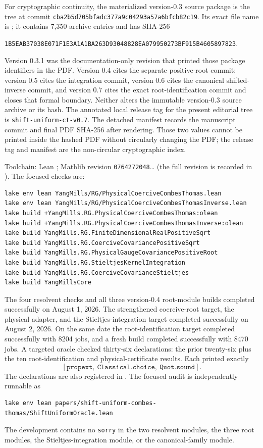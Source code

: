 \documentclass[11pt]{article}
\theoremstyle{definition}
\newcommand{\lean}[1]{\texttt{#1}}
\begin{document}
For cryptographic continuity, the materialized version-0.3 source package is
the tree at commit
\lean{cba2b5d705bfadc377a9c04293a57a6bfcb82c19}.  Its exact file name is
; it contains 7,350 archive
entries and has SHA-256
\begin{center}
\small\lean{1B5EAB37038E071F1E3A1A1BA263D93048828EA079950273BF915B4605897823}.
\end{center}
Version 0.3.1 was the documentation-only revision that printed those package
identifiers in the PDF.  Version 0.4 cites the separate positive-root commit;
version 0.5 cites the integration commit, version 0.6 cites the canonical
shifted-inverse commit, and version 0.7 cites the exact root-identification
commit and closes that formal boundary.
Neither alters the immutable version-0.3 source archive or its hash.  The
annotated local release tag for the present editorial tree is
\lean{shift-uniform-ct-v0.7}.  The detached  manifest records
the manuscript commit and final PDF SHA-256 after rendering.  Those two values
cannot be printed inside the hashed PDF without circularly changing the PDF;
the release tag and manifest are the non-circular cryptographic index.

Toolchain: Lean ; Mathlib revision
\texttt{0764272048}\ldots{} (the full revision is recorded in
).  The focused checks are:
\begin{verbatim}
lake env lean YangMills/RG/PhysicalCoerciveCombesThomas.lean
lake env lean YangMills/RG/PhysicalCoerciveCombesThomasInverse.lean
lake build +YangMills.RG.PhysicalCoerciveCombesThomas:olean
lake build +YangMills.RG.PhysicalCoerciveCombesThomasInverse:olean
lake build YangMills.RG.FiniteDimensionalRealPositiveSqrt
lake build YangMills.RG.CoerciveCovariancePositiveSqrt
lake build YangMills.RG.PhysicalGaugeCovariancePositiveRoot
lake build YangMills.RG.StieltjesKernelIntegration
lake build YangMills.RG.CoerciveCovarianceStieltjes
lake build YangMillsCore
\end{verbatim}
The four resolvent checks and all three version-0.4 root-module builds completed
successfully on August 1, 2026.  The strengthened coercive-root target, the
physical adapter, and the Stieltjes-integration target completed successfully
on August 2, 2026.  On the same date the root-identification target completed
successfully with 8204 jobs, and a fresh  build completed
successfully with 8470 jobs.  A targeted oracle checked thirty-six
declarations: the prior twenty-six plus the ten root-identification and
physical-certificate results.  Each printed exactly
\[
 [\lean{propext},\ \lean{Classical.choice},\ \lean{Quot.sound}].
\]
The declarations are also registered in .  The
focused audit is independently runnable as
\begin{verbatim}
lake env lean papers/shift-uniform-combes-thomas/ShiftUniformOracle.lean
\end{verbatim}
The development contains no \lean{sorry} in the two resolvent modules, the
three root modules, the Stieltjes-integration module, or the canonical-family
module.
\end{document}
